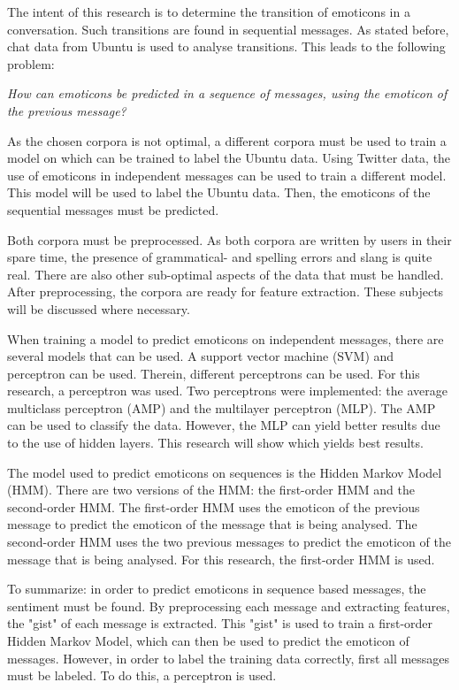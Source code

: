 
\begin{comment}
Problem: (roughly 1-2 pages)
• Explain the problem; what kind of assumptions / observations you have about the problem

\red{Find out what should be actually in this section} \\
\end{comment}

The intent of this research is to determine the transition of emoticons in a conversation. Such transitions are found in sequential messages. As stated before, chat data from Ubuntu is used to analyse transitions. This leads to the following problem: 
\begin{center}
\textit{How can emoticons be predicted in a sequence of messages, using the emoticon of the previous message?}
\end{center}

As the chosen corpora is not optimal, a different corpora must be used to train a model on which can be trained to label the Ubuntu data. Using Twitter data, the use of emoticons in independent messages can be used to train a different model. This model will be used to label the Ubuntu data. Then, the emoticons of the sequential messages must be predicted.

Both corpora must be preprocessed. As both corpora are written by users in their spare time, the presence of grammatical- and spelling errors and slang is quite real. There are also other sub-optimal aspects of the data that must be handled. After preprocessing, the corpora are ready for feature extraction. These subjects will be discussed where necessary.

When training a model to predict emoticons on independent messages, there are several models that can be used. A support vector machine (SVM) and perceptron can be used. Therein, different perceptrons can be used. For this research, a perceptron was used. Two perceptrons were implemented: the average multiclass perceptron (AMP) and the multilayer perceptron (MLP). The AMP can be used to classify the data. However, the MLP can yield better results due to the use of hidden layers. This research will show which yields best results.

The model used to predict emoticons on sequences is the Hidden Markov Model (HMM). There are two versions of the HMM: the first-order HMM and the second-order HMM. The first-order HMM uses the emoticon of the previous message to predict the emoticon of the message that is being analysed. The second-order HMM uses the two previous messages to predict the emoticon of the message that is being analysed. For this research, the first-order HMM is used.

To summarize: in order to predict emoticons in sequence based messages, the sentiment must be found. By preprocessing each message and extracting features, the "gist" of each message is extracted. This "gist" is used to train a first-order Hidden Markov Model, which can then be used to predict the emoticon of messages. However, in order to label the training data correctly, first all messages must be labeled. To do this, a perceptron is used.